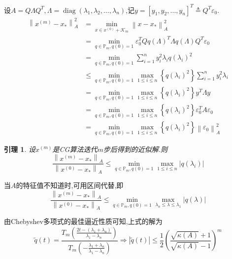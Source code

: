 \documentclass[notheorems,serif]{beamer}
\newcommand{\hei}[1]{{\HEI#1}}
\newtheorem{lemma}{\hei{引理}}
\begin{document}
\begin{frame}
设$A=Q \Lambda Q^{T}, \Lambda=\operatorname{diag}\left(\lambda_{1}, \lambda_{2}, \ldots, \lambda_{n}\right)$,记$y=\left[y_{1}, y_{2}, \ldots, y_{n}\right]^{T} \triangleq Q^{T} \varepsilon_{0}$.
$$
\begin{aligned}
\left\|x^{(m)}-x_{*}\right\|_{A}^{2} &=\min _{x \in x^{(0)}+\mathcal{K}_{m}}\left\|x-x_{*}\right\|_{A}^{2} \\ 
&=\min _{q \in \mathbb{P}_{m}, q(0)=1} \varepsilon_{0}^{T} Q q(\Lambda)^{T} \Lambda q(\Lambda) Q^{T} \varepsilon_{0} \\ 
&=\min _{q \in \mathbb{P}_{m}, q(0)=1} \sum_{i=1}^{n} y_{i}^{2} \lambda_{i} q\left(\lambda_{i}\right)^{2}\\
&\leq \min _{q \in \mathbb{P}_{m}, q(0)=1} \max _{1 \leq i \leq n}\left\{q\left(\lambda_{i}\right)^{2}\right\} \sum_{i=1}^{n} y_{i}^{2} \lambda_{i}\\
&=\min _{q \in \mathbb{P}_{m}, q(0)=1} \max _{1 \leq i \leq n}\left\{q\left(\lambda_{i}\right)^{2}\right\} y^{T} \Lambda y\\
&=\min _{q \in \mathbb{P}_{m}, q(0)=1} \max _{1 \leq i \leq n}\left\{q\left(\lambda_{i}\right)^{2}\right\} \varepsilon_{0}^{T} A \varepsilon_{0}\\
&=\min _{q \in \mathbb{P}_{m}, q(0)=1} \max _{1 \leq i \leq n}\left\{q\left(\lambda_{i}\right)^{2}\right\}\left\|\varepsilon_{0}\right\|_{A}^{2}
\end{aligned}
$$
\end{frame}

\begin{frame}
\begin{lemma}
设$x^{(m)}$是CG算法迭代$m$步后得到的近似解.则
$$
\frac{\left\|x^{(m)}-x_{*}\right\|_{A}}{\left\|x^{(0)}-x_{*}\right\|_{A}} \leq \min _{q \in \mathbb{P}_{m}, q(0)=1} \max _{1 \leq i \leq n}\left|q\left(\lambda_{i}\right)\right|
$$
\end{lemma}
当$A$的特征值不知道时,可用区间代替,即
$$
\frac{\left\|x^{(m)}-x_{*}\right\|_{A}}{\left\|x^{(0)}-x_{*}\right\|_{A}} \leq \min _{q \in \mathbb{P}_{m}, q(0)=1} \max _{\lambda_{n} \leq \lambda \leq \lambda_{1}}|q(\lambda)|
$$

由Chebyshev多项式的最佳逼近性质可知,上式的解为
$$
\tilde{q}(t)=\frac{T_{m}\left(\frac{2 t-\left(\lambda_{1}+\lambda_{n}\right)}{\lambda_{1}-\lambda_{n}}\right)}{T_{m}\left(-\frac{\lambda_{1}+\lambda_{n}}{\lambda_{1}-\lambda_{n}}\right)} \Longrightarrow|\tilde{q}(t)| \leq \frac{1}{2}\left(\frac{\sqrt{\kappa(A)}+1}{\sqrt{\kappa(A)}-1}\right)^{m}
$$
\end{frame}
\end{document}

